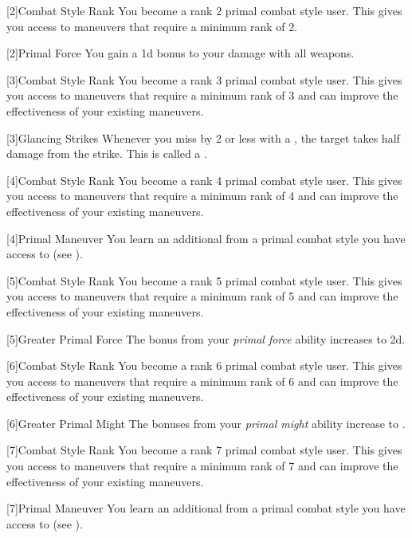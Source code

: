         {
            [2]{Combat Style Rank} You become a rank 2 primal combat style user.
            This gives you access to maneuvers that require a minimum rank of 2.

            [2]{Primal Force} You gain a \plus1d bonus to your damage with all weapons.
        }

        {
            [3]{Combat Style Rank} You become a rank 3 primal combat style user.
            This gives you access to maneuvers that require a minimum rank of 3 and can improve the effectiveness of your existing maneuvers.

            [3]{Glancing Strikes} Whenever you miss by 2 or less with a , the target takes half damage from the strike.
            This is called a .
        }

        {
            [4]{Combat Style Rank} You become a rank 4 primal combat style user.
            This gives you access to maneuvers that require a minimum rank of 4 and can improve the effectiveness of your existing maneuvers.

            [4]{Primal Maneuver}
            You learn an additional  from a primal combat style you have access to (see ).
        }

        {
            [5]{Combat Style Rank} You become a rank 5 primal combat style user.
            This gives you access to maneuvers that require a minimum rank of 5 and can improve the effectiveness of your existing maneuvers.

            [5]{Greater Primal Force} The bonus from your \textit{primal force} ability increases to \plus2d.
        }

        {
            [6]{Combat Style Rank} You become a rank 6 primal combat style user.
            This gives you access to maneuvers that require a minimum rank of 6 and can improve the effectiveness of your existing maneuvers.

            [6]{Greater Primal Might} The bonuses from your \textit{primal might} ability increase to .
        }

        {
            [7]{Combat Style Rank} You become a rank 7 primal combat style user.
            This gives you access to maneuvers that require a minimum rank of 7 and can improve the effectiveness of your existing maneuvers.

            [7]{Primal Maneuver}
            You learn an additional  from a primal combat style you have access to (see ).

        }


